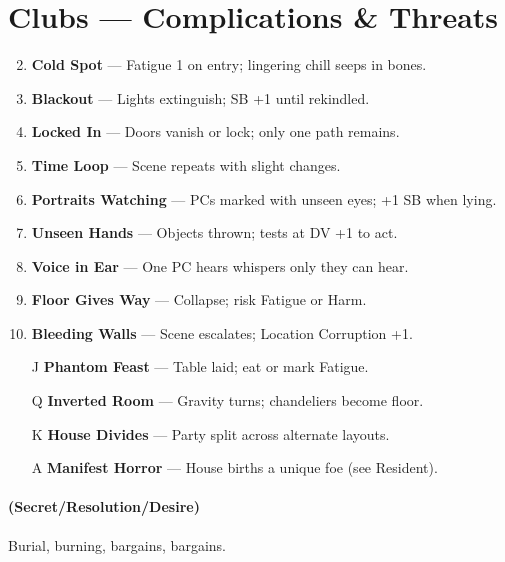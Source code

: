 \documentclass[11pt]{article}
\begin{document}
\section*{Clubs --- Complications \& Threats}
\label{sec:haunted-house-complications}
\begin{enumerate}
\setcounter{enumi}{1}
\item \textbf{Cold Spot} --- Fatigue 1 on entry; lingering chill seeps in bones.
\item \textbf{Blackout} --- Lights extinguish; SB +1 until rekindled.
\item \textbf{Locked In} --- Doors vanish or lock; only one path remains.
\item \textbf{Time Loop} --- Scene repeats with slight changes.
\item \textbf{Portraits Watching} --- PCs marked with unseen eyes; +1 SB when lying.
\item \textbf{Unseen Hands} --- Objects thrown; tests at DV +1 to act.
\item \textbf{Voice in Ear} --- One PC hears whispers only they can hear.
\item \textbf{Floor Gives Way} --- Collapse; risk Fatigue or Harm.
\item \textbf{Bleeding Walls} --- Scene escalates; Location Corruption +1.
\item[J] \textbf{Phantom Feast} --- Table laid; eat or mark Fatigue.
\item[Q] \textbf{Inverted Room} --- Gravity turns; chandeliers become floor.
\item[K] \textbf{House Divides} --- Party split across alternate layouts.
\item[A] \textbf{Manifest Horror} --- House births a unique foe (see Resident).
\end{enumerate}

\paragraph*{(Secret/Resolution/Desire)} Burial, burning, bargains, bargains.
\end{document}
